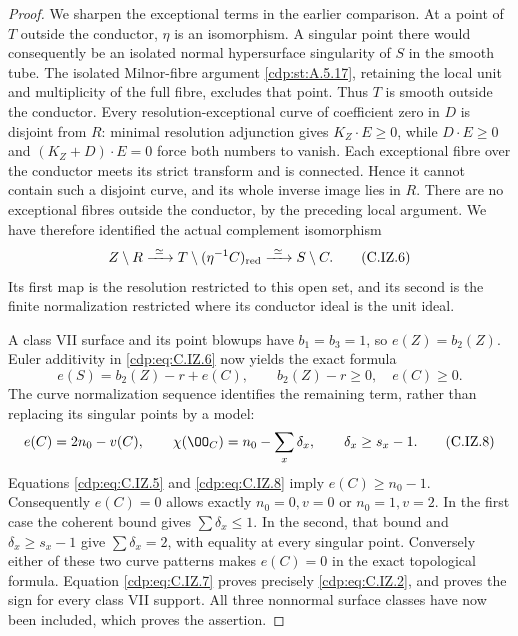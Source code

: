 \begin{proof}
We sharpen the exceptional terms in the earlier comparison.
At a point of $T$ outside the conductor, $\eta$ is an
isomorphism. A singular point there would consequently be
an isolated normal hypersurface singularity of $S$ in
the smooth tube. The isolated Milnor-fibre argument
\ref{cdp:st:A.5.17}, retaining the local unit and multiplicity of
the full fibre, excludes that point. Thus $T$ is smooth
outside the conductor. Every resolution-exceptional curve
of coefficient zero in $D$ is disjoint from $R$: minimal
resolution adjunction gives $K_Z\cdot E\ge0$, while
$D\cdot E\ge0$ and $(K_Z+D)\cdot E=0$ force both
numbers to vanish. Each exceptional fibre over the
conductor meets its strict transform and is connected.
Hence it cannot contain such a disjoint curve, and its
whole inverse image lies in $R$. There are no exceptional
fibres outside the conductor, by the preceding local
argument. We have therefore identified the actual
complement isomorphism
\[
 Z\setminus R\xrightarrow{\ \simeq\ }
 T\setminus(\eta^{-1}C)_{\rm red}
 \xrightarrow{\ \simeq\ }S\setminus C.                \tag{C.IZ.6}\label{cdp:eq:C.IZ.6}
\]
Its first map is the resolution restricted to this open
set, and its second is the finite normalization restricted
where its conductor ideal is the unit ideal.

A class VII surface and its point blowups have
$b_1=b_3=1$, so $e(Z)=b_2(Z)$. Euler additivity in
\eqref{cdp:eq:C.IZ.6} now yields the exact formula
\[
 e(S)=b_2(Z)-r+e(C),\qquad
 b_2(Z)-r\ge0,\quad e(C)\ge0.                           \tag{C.IZ.7}\label{cdp:eq:C.IZ.7}
\]
The curve normalization sequence identifies the remaining
term, rather than replacing its singular points by a
model:
\[
 e(C)=2n_0-v(C),\qquad
 \chi(\OO_C)=n_0-\sum_x\delta_x,\qquad
 \delta_x\ge s_x-1.                                    \tag{C.IZ.8}\label{cdp:eq:C.IZ.8}
\]
Equations \eqref{cdp:eq:C.IZ.5} and \eqref{cdp:eq:C.IZ.8} imply $e(C)\ge n_0-1$.
Consequently $e(C)=0$ allows exactly $n_0=0,v=0$ or
$n_0=1,v=2$. In the first case the coherent bound gives
$\sum\delta_x\le1$. In the second, that bound and
$\delta_x\ge s_x-1$ give $\sum\delta_x=2$, with equality
at every singular point. Conversely either of these
two curve patterns makes $e(C)=0$ in the exact
topological formula. Equation \eqref{cdp:eq:C.IZ.7} proves precisely
\eqref{cdp:eq:C.IZ.2}, and proves the sign for every class VII
support. All three nonnormal surface classes have now
been included, which proves the assertion.
\end{proof}